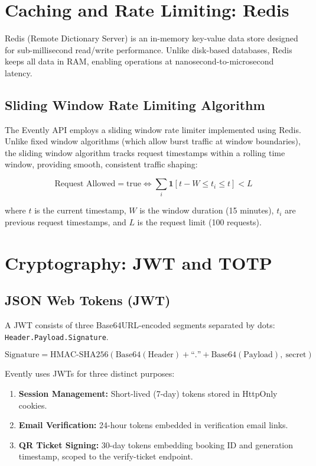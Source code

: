 \documentclass[12pt,a4paper]{report}
\begin{document}
\section{Caching and Rate Limiting: Redis}
Redis (Remote Dictionary Server) is an in-memory key-value data store designed for sub-millisecond read/write performance. Unlike disk-based databases, Redis keeps all data in RAM, enabling operations at nanosecond-to-microsecond latency.

\subsection{Sliding Window Rate Limiting Algorithm}
The Evently API employs a sliding window rate limiter implemented using Redis. Unlike fixed window algorithms (which allow burst traffic at window boundaries), the sliding window algorithm tracks request timestamps within a rolling time window, providing smooth, consistent traffic shaping:

\begin{equation}
    \text{Request Allowed} = \text{true} \iff \sum_{i} \mathbf{1}[t - W \leq t_i \leq t] < L
\end{equation}

where $t$ is the current timestamp, $W$ is the window duration (15 minutes), $t_i$ are previous request timestamps, and $L$ is the request limit (100 requests).

\section{Cryptography: JWT and TOTP}

\subsection{JSON Web Tokens (JWT)}
A JWT consists of three Base64URL-encoded segments separated by dots: \texttt{Header.Payload.Signature}.

\begin{equation}
    \text{Signature} = \text{HMAC-SHA256}\left(\text{Base64}(\text{Header}) + \text{``.''} + \text{Base64}(\text{Payload}),\ \text{secret}\right)
\end{equation}

Evently uses JWTs for three distinct purposes:
\begin{enumerate}[leftmargin=2em]
    \item \textbf{Session Management:} Short-lived (7-day) tokens stored in HttpOnly cookies.
    \item \textbf{Email Verification:} 24-hour tokens embedded in verification email links.
    \item \textbf{QR Ticket Signing:} 30-day tokens embedding booking ID and generation timestamp, scoped to the verify-ticket endpoint.
\end{enumerate}
\end{document}
